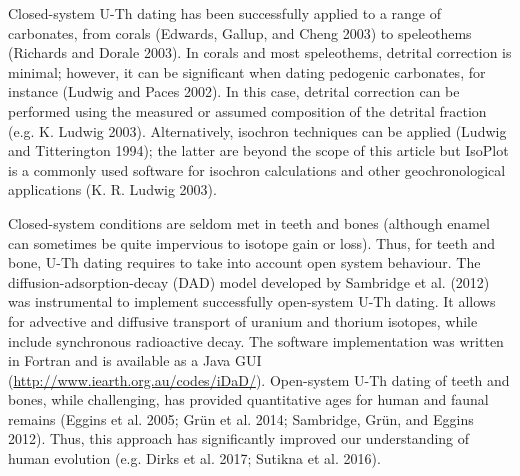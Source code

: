 \documentclass[]{elsarticle} %
\begin{document}
Closed-system U-Th dating has been successfully applied to a range of carbonates, from corals (Edwards, Gallup, and Cheng 2003) to speleothems (Richards and Dorale 2003). In corals and most speleothems, detrital correction is minimal; however, it can be significant when dating pedogenic carbonates, for instance (Ludwig and Paces 2002). In this case, detrital correction can be performed using the measured or assumed composition of the detrital fraction (e.g. K. Ludwig 2003). Alternatively, isochron techniques can be applied (Ludwig and Titterington 1994); the latter are beyond the scope of this article but IsoPlot is a commonly used software for isochron calculations and other geochronological applications (K. R. Ludwig 2003).

Closed-system conditions are seldom met in teeth and bones (although enamel can sometimes be quite impervious to isotope gain or loss). Thus, for teeth and bone, U-Th dating requires to take into account open system behaviour. The diffusion-adsorption-decay (DAD) model developed by Sambridge et al. (2012) was instrumental to implement successfully open-system U-Th dating. It allows for advective and diffusive transport of uranium and thorium isotopes, while include synchronous radioactive decay. The software implementation was written in Fortran and is available as a Java GUI (\url{http://www.iearth.org.au/codes/iDaD/}).
Open-system U-Th dating of teeth and bones, while challenging, has provided quantitative ages for human and faunal remains (Eggins et al. 2005; Grün et al. 2014; Sambridge, Grün, and Eggins 2012). Thus, this approach has significantly improved our understanding of human evolution (e.g. Dirks et al. 2017; Sutikna et al. 2016).
\end{document}
